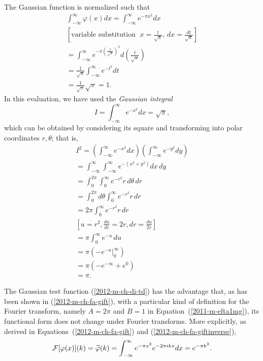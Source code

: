 The Gaussian function is normalized such that
\begin{equation}
\begin{split}
\int_{-\infty}^{ \infty} \varphi (x)dx =
\int_{-\infty}^{ \infty} e^{-\pi x^2}dx \\
  [\textrm{variable substitution }\; x = \frac{t}{\sqrt{\pi}}, \, dx = \frac{dt}{\sqrt{\pi}} ]\\
= \int_{-\infty}^{ \infty}  e^{-\pi \left(\frac{t}{\sqrt{\pi}}\right)^2}d\left(\frac{t}{\sqrt{\pi}}\right)  \\
=\frac{1}{ \sqrt{\pi} } \int_{-\infty}^{ \infty}  e^{- t^2}dt  \\
=\frac{1}{\sqrt{\pi} } \sqrt{\pi} = 1.
\end{split}
\end{equation}
In this evaluation, we have used the {\em Gaussian integral}
\begin{equation}
I= \int_{-\infty}^{ \infty}  e^{-x^2}dx=   \sqrt{\pi},
\label{2018-m-ch-di-gi}
\end{equation}
which can be obtained by considering its square and transforming into polar coordinates $r,\theta$; that  is,
\begin{equation}
\begin{split}
I^2 =
\left(\int_{-\infty}^{ \infty}  e^{-x^2}dx\right)\left(\int_{-\infty}^{ \infty}  e^{-y^2}dy\right)  \\
  =
 \int_{-\infty}^{ \infty} \int_{-\infty}^{ \infty}   e^{-\left(x^2+y^2\right)}dx \,dy   \\
  =
 \int_{0}^{2\pi } \int_{0}^{ \infty}   e^{-r^2}r \, d\theta \,dr   \\
  =
 \int_{0}^{2\pi }  d\theta \int_{0}^{ \infty}   e^{-r^2}r  \,dr   \\
  =
 2\pi   \int_{0}^{ \infty}   e^{-r^2}r  \,dr   \\
\left[
u=r^2, \frac{du}{dr} =2r, dr =  \frac{du}{2r}
\right]   \\
  =
  \pi   \int_{0}^{ \infty}   e^{-u}  \,du  \\
  =
  \pi     \left( \left. - e^{-u} \right|_{0}^{ \infty} \right)  \\
  =
  \pi     \left( - e^{-\infty} + e^{0} \right)  \\
  =
  \pi .
\end{split}
\label{2012-m-ch-di-gi2}
\end{equation}

The  Gaussian  test function (\ref{2012-m-ch-di-td})
has the advantage that, as has been shown in
(\ref{2012-m-ch-fa-gift}),
with a particular kind of definition for the Fourier transform,
namely  $A=2\pi $ and $B=1$  in Equation~(\ref{2011-m-efta1mg}),
its functional form does not change under Fourier transforms.
More explicitly, as derived in Equations~(\ref{2012-m-ch-fa-gift})
and
(\ref{2012-m-ch-fa-giftinverse}),
\begin{equation}
    {\cal F}[\varphi (x)](k)=\widetilde{\varphi} (k) =  \int_{-\infty}^\infty
                e^{-\pi  x^2}  e^{- 2\pi ikx} dx
 = e^{-{\pi k^2}} .
\end{equation}

